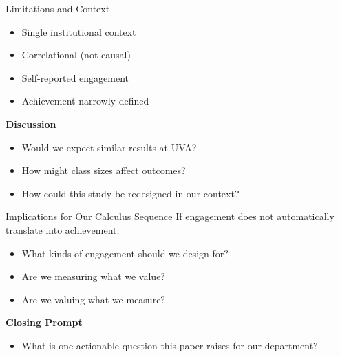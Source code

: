 \documentclass{beamer}
\begin{document}
\begin{frame}{Limitations and Context}
\begin{itemize}
    \item Single institutional context
    \item Correlational (not causal)
    \item Self-reported engagement
    \item Achievement narrowly defined
\end{itemize}

\bigskip

\textbf{Discussion}
\begin{itemize}
    \item Would we expect similar results at UVA?
    \item How might class sizes affect outcomes?
    \item How could this study be redesigned in our context?
\end{itemize}
\end{frame}

\begin{frame}{Implications for Our Calculus Sequence}
If engagement does not automatically translate into achievement:

\begin{itemize}
    \item What kinds of engagement should we design for?
    \item Are we measuring what we value?
    \item Are we valuing what we measure?
\end{itemize}

\bigskip

\textbf{Closing Prompt}
\begin{itemize}
    \item What is one actionable question this paper raises for our department?
\end{itemize}
\end{frame}







    
\end{document}
